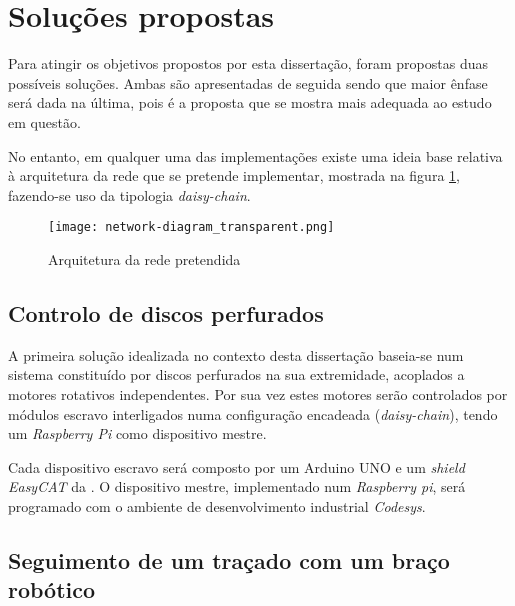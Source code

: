 \section{Soluções propostas} \label{sec:solution}

Para atingir os objetivos propostos por esta dissertação, foram propostas 
duas possíveis soluções. Ambas são apresentadas de seguida sendo que
maior ênfase será dada na última, pois é a proposta que se mostra mais
adequada ao estudo em questão.

No entanto, em qualquer uma das implementações existe uma ideia base
relativa à arquitetura da rede \ecat que se pretende implementar,
mostrada na figura \ref{fig:network-architecture}, fazendo-se uso da
tipologia \emph{daisy-chain}.

\begin{figure}
 \centering
 \texttt{[image: network-diagram\_transparent.png]}
 \caption{Arquitetura da rede \ecat pretendida}
 \label{fig:network-architecture}
\end{figure}



\subsection{Controlo de discos perfurados}

A primeira solução idealizada no contexto desta dissertação baseia-se num
sistema constituído por discos perfurados na sua extremidade, acoplados
a motores rotativos independentes. Por sua vez estes motores serão
controlados por módulos \ecat escravo interligados numa configuração
encadeada (\emph{daisy-chain}), tendo um \emph{Raspberry Pi} como dispositivo
mestre.

Cada dispositivo \ecat escravo será composto por um Arduino UNO 
\cite[]{arduino:ArduinoUNORev3} e um \emph{shield EasyCAT} da 
\cite{ABT:EasyCAT}. O dispositivo mestre, implementado num \emph{Raspberry
pi}, será programado com o ambiente de desenvolvimento industrial \emph{
Codesys}.

\subsection{Seguimento de um traçado com um braço robótico}


